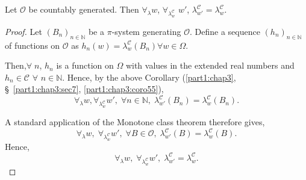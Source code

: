 \begin{corollary}\label{part1:chap3:coro56}
Let $\mathscr{O}$ be countably generated. Then  $\forall_\lambda w$,
$\forall_{\lambda^\mathscr{C}_w}$ $w'$, $\lambda^\mathscr{C}_{w'} =
\lambda^\mathscr{C}_w$. 
\end{corollary}

\begin{proof}
Let $(B_n)_{n \in \mathbb{N}}$ be a $\pi$-system generating
$\mathscr{O}$. Define a sequence $(h_n)_{n\in \mathbb{N}}$ of
functions on $\mathscr{O}$ as $h_n (w) =
\lambda^\mathscr{C}_w(B_n)\forall w \in \Omega$. 

Then,\pageoriginale $\forall \; n$, $h_n$ is a function on $\Omega$
with values in the extended real numbers and $h_n \in \mathscr{C}$
$\forall$ $ n \in\mathbb{N}$. Hence, by the above Corollary (\ref{part1:chap3},
\S\ \ref{part1:chap3:sec7}, \ref{part1:chap3:coro55}),
$$
\forall_\lambda w, \forall_{\lambda^{\mathscr{C}}_w} w', \; \forall n
\in \mathbb{N} , \; \lambda^{\mathscr{C}}_{w'} (B_n) =
\lambda^\mathscr{C}_w (B_n). 
$$

A standard application of the Monotone class theorem therefore gives, 
$$
\forall_\lambda w, \; \forall_{\lambda^\mathscr{C}_w} w', \; \forall B
\in \mathscr{O}, \; \lambda^\mathscr{C}_{w'} (B) = \lambda^\mathscr{C}_w(B).
$$
Hence,
$$
\forall_\lambda w, \; \forall_{\lambda^\mathscr{C}_w} w', \;
\lambda^\mathscr{C}_{w'} = \lambda^\mathscr{C}_w. 
$$
\end{proof}

